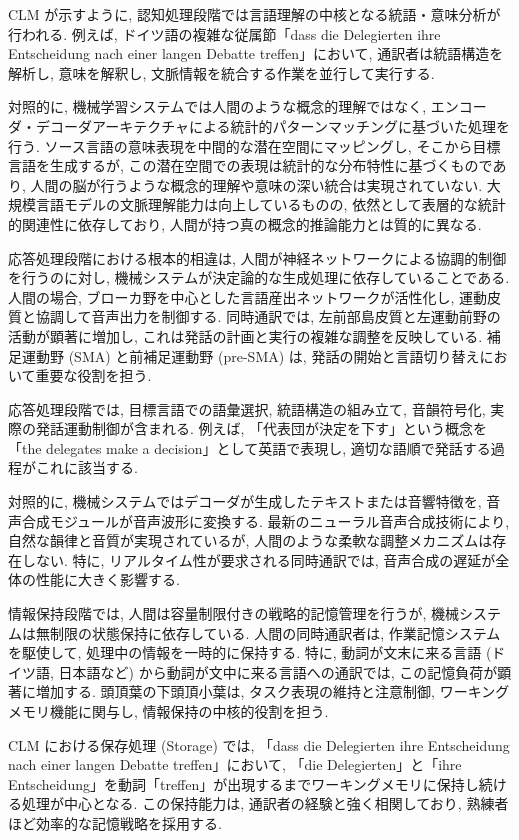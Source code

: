 CLM が示すように, 認知処理段階では言語理解の中核となる統語・意味分析が行われる.
例えば, ドイツ語の複雑な従属節「dass die Delegierten ihre Entscheidung nach einer langen Debatte treffen」において, 通訳者は統語構造を解析し, 意味を解釈し, 文脈情報を統合する作業を並行して実行する.

対照的に, 機械学習システムでは人間のような概念的理解ではなく, エンコーダ・デコーダアーキテクチャによる統計的パターンマッチングに基づいた処理を行う.
ソース言語の意味表現を中間的な潜在空間にマッピングし, そこから目標言語を生成するが, この潜在空間での表現は統計的な分布特性に基づくものであり, 人間の脳が行うような概念的理解や意味の深い統合は実現されていない.
大規模言語モデルの文脈理解能力は向上しているものの, 依然として表層的な統計的関連性に依存しており, 人間が持つ真の概念的推論能力とは質的に異なる.

応答処理段階における根本的相違は, 人間が神経ネットワークによる協調的制御を行うのに対し, 機械システムが決定論的な生成処理に依存していることである.
人間の場合, ブローカ野を中心とした言語産出ネットワークが活性化し, 運動皮質と協調して音声出力を制御する.
同時通訳では, 左前部島皮質と左運動前野の活動が顕著に増加し, これは発話の計画と実行の複雑な調整を反映している.
補足運動野 (SMA) と前補足運動野 (pre-SMA) は, 発話の開始と言語切り替えにおいて重要な役割を担う.

応答処理段階では, 目標言語での語彙選択, 統語構造の組み立て, 音韻符号化, 実際の発話運動制御が含まれる.
例えば, 「代表団が決定を下す」という概念を「the delegates make a decision」として英語で表現し, 適切な語順で発話する過程がこれに該当する.

対照的に, 機械システムではデコーダが生成したテキストまたは音響特徴を, 音声合成モジュールが音声波形に変換する.
最新のニューラル音声合成技術により, 自然な韻律と音質が実現されているが, 人間のような柔軟な調整メカニズムは存在しない.
特に, リアルタイム性が要求される同時通訳では, 音声合成の遅延が全体の性能に大きく影響する.

情報保持段階では, 人間は容量制限付きの戦略的記憶管理を行うが, 機械システムは無制限の状態保持に依存している.
人間の同時通訳者は, 作業記憶システムを駆使して, 処理中の情報を一時的に保持する.
特に, 動詞が文末に来る言語 (ドイツ語, 日本語など) から動詞が文中に来る言語への通訳では, この記憶負荷が顕著に増加する.
頭頂葉の下頭頂小葉は, タスク表現の維持と注意制御, ワーキングメモリ機能に関与し, 情報保持の中核的役割を担う.

CLM における保存処理 (Storage) では, 「dass die Delegierten ihre Entscheidung nach einer langen Debatte treffen」において, 「die Delegierten」と「ihre Entscheidung」を動詞「treffen」が出現するまでワーキングメモリに保持し続ける処理が中心となる.
この保持能力は, 通訳者の経験と強く相関しており, 熟練者ほど効率的な記憶戦略を採用する.

